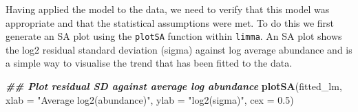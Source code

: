 \documentclass[9pt,a4paper,]{extarticle}
\newenvironment{Shaded}{\begin{snugshade}}{\end{snugshade}}
\newcommand{\AttributeTok}[1]{\textcolor[rgb]{0.13,0.29,0.53}{#1}}
\newcommand{\ConstantTok}[1]{\textcolor[rgb]{0.56,0.35,0.01}{#1}}
\newcommand{\DocumentationTok}[1]{\textcolor[rgb]{0.56,0.35,0.01}{\textbf{\textit{#1}}}}
\newcommand{\FloatTok}[1]{\textcolor[rgb]{0.00,0.00,0.81}{#1}}
\newcommand{\FunctionTok}[1]{\textcolor[rgb]{0.13,0.29,0.53}{\textbf{#1}}}
\newcommand{\NormalTok}[1]{#1}
\newcommand{\OtherTok}[1]{\textcolor[rgb]{0.56,0.35,0.01}{#1}}
\newcommand{\SpecialCharTok}[1]{\textcolor[rgb]{0.81,0.36,0.00}{\textbf{#1}}}
\newcommand{\StringTok}[1]{\textcolor[rgb]{0.31,0.60,0.02}{#1}}
\begin{document}
\begin{Shaded}
\end{Shaded}

Having applied the model to the data, we need to verify that this model was
appropriate and that the statistical assumptions were met. To do this we first
generate an SA plot using the \texttt{plotSA} function within \texttt{limma}. An SA plot shows
the log2 residual standard deviation (sigma) against log average abundance and
is a simple way to visualise the trend that has been fitted to the data.

\begin{Shaded}
\begin{Highlighting}[]
\DocumentationTok{\#\# Plot residual SD against average log abundance}
\FunctionTok{plotSA}\NormalTok{(fitted\_lm,}
       \AttributeTok{xlab =} \StringTok{"Average log2(abundance)"}\NormalTok{,}
       \AttributeTok{ylab =} \StringTok{"log2(sigma)"}\NormalTok{,}
       \AttributeTok{cex =} \FloatTok{0.5}\NormalTok{)}
\end{Highlighting}
\end{Shaded}
\end{document}

